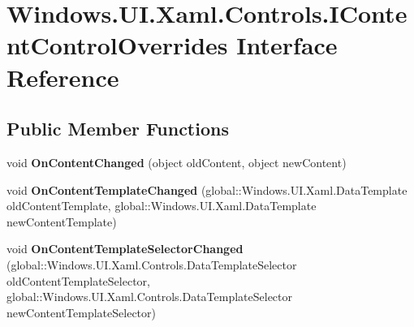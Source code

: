 \hypertarget{interface_windows_1_1_u_i_1_1_xaml_1_1_controls_1_1_i_content_control_overrides}{}\section{Windows.\+U\+I.\+Xaml.\+Controls.\+I\+Content\+Control\+Overrides Interface Reference}
\label{interface_windows_1_1_u_i_1_1_xaml_1_1_controls_1_1_i_content_control_overrides}
\subsection*{Public Member Functions}
\begin{DoxyCompactItemize}
\item 
\mbox{\label{interface_windows_1_1_u_i_1_1_xaml_1_1_controls_1_1_i_content_control_overrides_a927b9318fd0f295313825c3e746af39d}} 
void {\bfseries On\+Content\+Changed} (object old\+Content, object new\+Content)
\item 
\mbox{\label{interface_windows_1_1_u_i_1_1_xaml_1_1_controls_1_1_i_content_control_overrides_aa589bdda994fa42b1307791c8667e26e}} 
void {\bfseries On\+Content\+Template\+Changed} (global\+::\+Windows.\+U\+I.\+Xaml.\+Data\+Template old\+Content\+Template, global\+::\+Windows.\+U\+I.\+Xaml.\+Data\+Template new\+Content\+Template)
\item 
\mbox{\label{interface_windows_1_1_u_i_1_1_xaml_1_1_controls_1_1_i_content_control_overrides_a5d05f634bc0c8579985bd7fff3790923}} 
void {\bfseries On\+Content\+Template\+Selector\+Changed} (global\+::\+Windows.\+U\+I.\+Xaml.\+Controls.\+Data\+Template\+Selector old\+Content\+Template\+Selector, global\+::\+Windows.\+U\+I.\+Xaml.\+Controls.\+Data\+Template\+Selector new\+Content\+Template\+Selector)
\item 
\mbox{\label{interface_windows_1_1_u_i_1_1_xaml_1_1_controls_1_1_i_content_control_overrides_a927b9318fd0f295313825c3e746af39d}} 

\end{DoxyCompactItemize}
